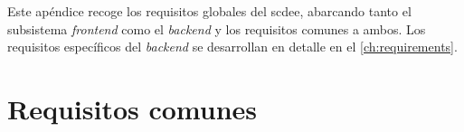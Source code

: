 %
%
%
%
%
%


Este apéndice recoge los requisitos globales del \ac{scdee}, abarcando
tanto el subsistema \textit{frontend} como el \textit{backend} y los
requisitos comunes a ambos. Los requisitos específicos del \textit{backend}
se desarrollan en detalle en el \cref{ch:requirements}.

\section{Requisitos comunes}

